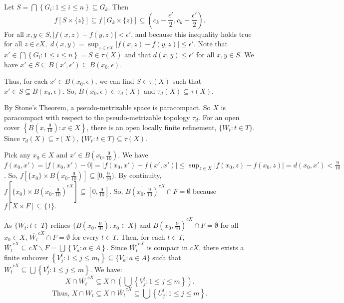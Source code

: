 \documentclass{article}
\begin{document}
		  \vskip 10pt

		  Let $S=\bigcap\left\{G_i:1\leq i \leq n\right\}  \subseteq G_k.$ Then 
		  $$f[S\times \{z\}]\subseteq f[G_k \times \{z\}] \subseteq (c_k-\frac{\epsilon'}{2}, c_k+\frac{\epsilon'}{2}).$$ 
		  \vskip 5pt
		  For all $x,y \in S, |f(x,z)-f(y,z)|<\epsilon'$, and because this inequality holds true for all $z \in cX,$ $d(x,y)=\displaystyle{\sup_{z\in cX}} |f(x,z)-f(y,z)|\leq \epsilon'.$ Note that $x' \in \bigcap \left\{G_i: 1\leq i \leq n\right\} = S\in \tau(X)$ and that $d(x,y)\leq \epsilon'$ for all $x,y \in S.$ We have $x' \in S \subseteq B(x',\epsilon') \subseteq B(x_0, \epsilon).$ 

		  \vskip 10pt


		  Thus, for each $x' \in B(x_0,\epsilon)$, we can find $S\in \tau(X)$ such that $x'\in S \subseteq B(x_0,\epsilon).$ So, $B(x_0, \epsilon)\in \tau_d(X)$ and $\tau_d(X) \subseteq \tau(X)$.

		  \vskip 10pt


		  By Stone's Theorem, a pseudo-metrizable space is paracompact. So $X$ is paracompact with respect to the pseudo-metrizable topology $\tau_d$. For an open cover $\left\{B(x,\frac{9}{10}): x\in X\right\}$, there is an open locally finite refinement, $\{W_t : t\in T\}.$ Since $\tau_d(X) \subseteq \tau(X)$, $\{W_t: t\in T\} \subseteq \tau(X)$. 


		  \vskip 10pt
		  Pick any $x_0\in X$ and $x' \in B(x_0,\frac{9}{10})$. We have $f(x_0, x')= |f(x_0,x')-0|=|f(x_0,x')-f(x',x')| \leq \sup_{z\in X}\left|f(x_0,z)-f(x_0,z)\right|= d(x_0,x') < \frac{9}{10}$. 
		  So, $f\left[\{x_0\} \times B(x_0, \frac{9}{10})\right] \subseteq [0,\frac{9}{10})$. By continuity, $f\left[\{x_0\}\times \overline{B(x_0,\frac{9}{10})}^{cX}\right] \subseteq [0,\frac{9}{10}].$ So, $\overline{B(x_0,\frac{9}{10})}^{cX} \cap F =\emptyset$ because $f\left[X\times F\right] \subseteq \{1\}.$

		  \vskip 15pt

		  As $\{W_t:  t\in T\}$ refines $\{B(x_0,\frac{9}{10}): x_0\in X\}$ and $\overline{B(x_0,\frac{9}{10})}^{cX} \cap F =\emptyset$ for all $x_0\in X$, $\overline{W_t}^{cX} \cap F = \emptyset$ for every $t \in T$. Then, for each $t\in T$, 
		  $\overline{W_t}^{cX} \subseteq cX\backslash F = \bigcup \left\{V_a: a\in A\right\}$. Since $\overline{W_t}^{cX}$ is compact in $cX$, there exists a finite subcover $\left\{V_j^t: 1\leq j\leq m_t\right\} \subseteq \{V_a: a \in A\}$ such that $\overline{W_t}^{cX} \subseteq \bigcup \left\{V_j^t: 1\leq j \leq m \right\}$. We have: 
		  $$X\cap \overline{W_t}^{cX} \subseteq X\cap (\bigcup \left\{V_j^t: 1\leq j \leq m\right\}).$$
		  $$\mbox{Thus, }X\cap W_t \subseteq X\cap \overline{W_t}^{cX} \subseteq \bigcup \left\{U_j^t: 1\leq j\leq m\right\}.$$
\end{document}
